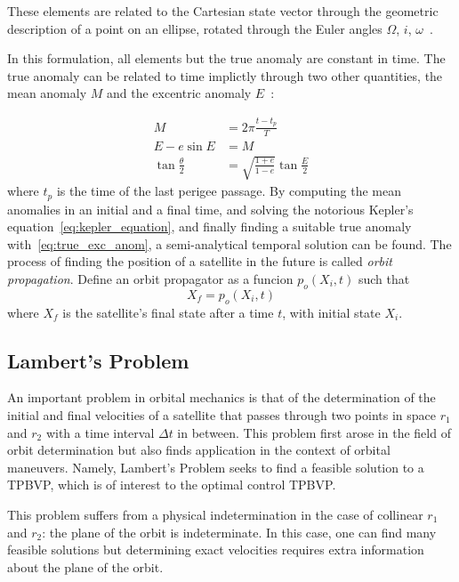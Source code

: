 These elements are related to the Cartesian state vector through the geometric description of a point on an ellipse, rotated through the Euler angles \(\Omega\), \(i\), \(\omega\)~\cite{curtis2015orbital}.


In this formulation, all elements but the true anomaly are constant in time. The true anomaly can be related to time implictly through two other quantities, the mean anomaly \(M\) and the excentric anomaly \(E\)~\cite{curtis2015orbital}:

\begin{align} 
        M &= 2\pi \frac{t - t_p}{T} \\
        E - e \sin{E} &= M \label{eq:kepler_equation}\\
        \tan{\frac{\theta}{2}} &= \sqrt{\frac{1+e}{1-e}} \tan{\frac{E}{2}} \label{eq:true_exc_anom}
\end{align}
where \(t_p\) is the time of the last perigee passage. By computing the mean anomalies in an initial and a final time, and solving the notorious Kepler's equation~\eqref{eq:kepler_equation}, and finally finding a suitable true anomaly with~\eqref{eq:true_exc_anom}, a semi-analytical temporal solution can be found. The process of finding the position of a satellite in the future is called \textit{orbit propagation}. Define an orbit propagator as a funcion \(p_o(X_i, t)\) such that
\begin{equation} \label{eq:orbit_propagator}
    X_f = p_o(X_i, t)
\end{equation}
where \(X_f\) is the satellite's final state after a time \(t\), with initial state \(X_i\).

\subsection{Lambert's Problem}

An important problem in orbital mechanics is that of the determination of the initial and final velocities of a satellite that passes through two points in space \(r_1\) and \(r_2\) with a time interval \(\Delta t\) in between. This problem first arose in the field of orbit determination but also finds application in the context of orbital maneuvers. Namely, Lambert's Problem seeks to find a feasible solution to a TPBVP, which is of interest to the optimal control TPBVP. 

This problem suffers from a physical indetermination in the case of collinear \(r_1\) and \(r_2\): the plane of the orbit is indeterminate. In this case, one can find many feasible solutions but determining exact velocities requires extra information about the plane of the orbit.\

